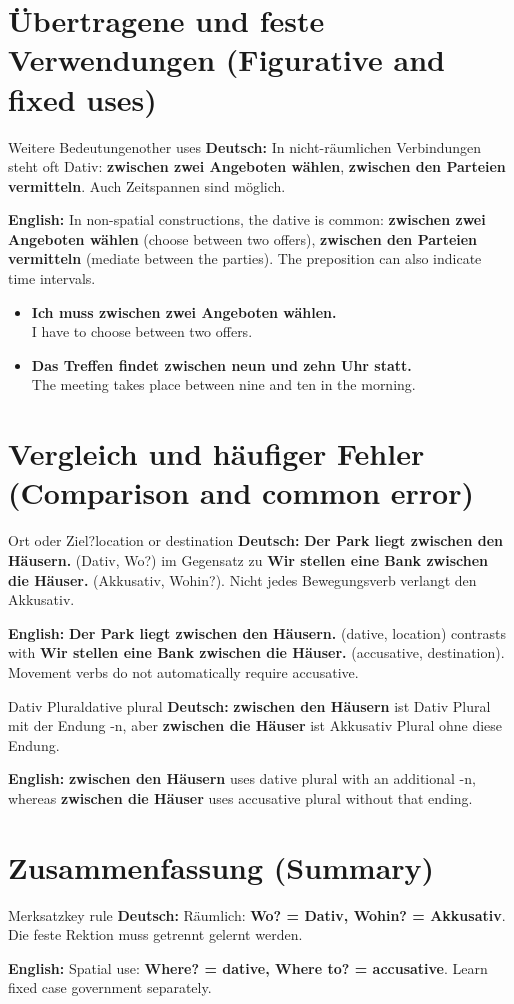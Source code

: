 \documentclass[a4paper,11pt]{article}
\newcommand{\GermanText}[1]{\textbf{Deutsch: }#1\par}
\newcommand{\EnglishText}[1]{{\small\color{SoftGray}\textbf{English: }#1\par}}
\newcommand{\ExampleItem}[2]{\item \textbf{#1}\\{\small\color{SoftGray}#2}}
\begin{document}
\section{Übertragene und feste Verwendungen (Figurative and fixed uses)}
\begin{grammarentry}{Weitere Bedeutungen}{other uses}
\GermanText{In nicht-räumlichen Verbindungen steht oft Dativ: \textbf{zwischen zwei Angeboten wählen}, \textbf{zwischen den Parteien vermitteln}. Auch Zeitspannen sind möglich.}
\EnglishText{In non-spatial constructions, the dative is common: \textbf{zwischen zwei Angeboten wählen} (choose between two offers), \textbf{zwischen den Parteien vermitteln} (mediate between the parties). The preposition can also indicate time intervals.}
\end{grammarentry}
\begin{exbox}
\begin{itemize}
\ExampleItem{Ich muss zwischen zwei Angeboten wählen.}{I have to choose between two offers.}
\ExampleItem{Das Treffen findet zwischen neun und zehn Uhr statt.}{The meeting takes place between nine and ten in the morning.}
\end{itemize}
\end{exbox}
\section{Vergleich und häufiger Fehler (Comparison and common error)}
\begin{grammarentry}{Ort oder Ziel?}{location or destination}
\GermanText{\textbf{Der Park liegt zwischen den Häusern.} (Dativ, Wo?) im Gegensatz zu \textbf{Wir stellen eine Bank zwischen die Häuser.} (Akkusativ, Wohin?). Nicht jedes Bewegungsverb verlangt den Akkusativ.}
\EnglishText{\textbf{Der Park liegt zwischen den Häusern.} (dative, location) contrasts with \textbf{Wir stellen eine Bank zwischen die Häuser.} (accusative, destination). Movement verbs do not automatically require accusative.}
\end{grammarentry}
\begin{grammarentry}{Dativ Plural}{dative plural}
\GermanText{\textbf{zwischen den Häusern} ist Dativ Plural mit der Endung -n, aber \textbf{zwischen die Häuser} ist Akkusativ Plural ohne diese Endung.}
\EnglishText{\textbf{zwischen den Häusern} uses dative plural with an additional -n, whereas \textbf{zwischen die Häuser} uses accusative plural without that ending.}
\end{grammarentry}
\section{Zusammenfassung (Summary)}
\begin{grammarentry}{Merksatz}{key rule}
\GermanText{Räumlich: \textbf{Wo? = Dativ, Wohin? = Akkusativ}. Die feste Rektion muss getrennt gelernt werden.}
\EnglishText{Spatial use: \textbf{Where? = dative, Where to? = accusative}. Learn fixed case government separately.}
\end{grammarentry}
\end{document}
